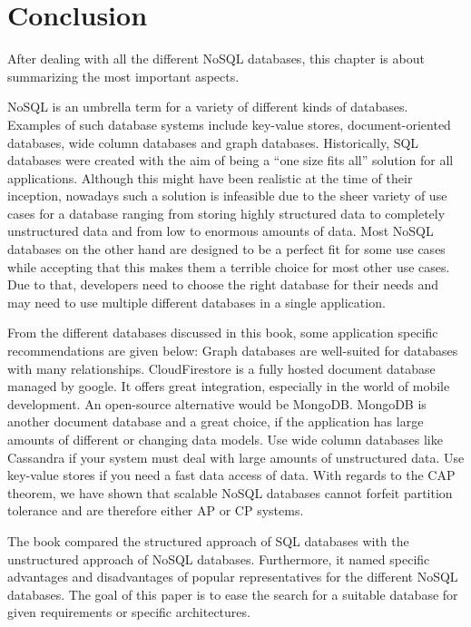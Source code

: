 
\chapter{Conclusion}
After dealing with all the different NoSQL databases, this chapter is about
summarizing the most important aspects.

NoSQL is an umbrella term for a variety of different kinds of databases.
Examples of such database systems include key-value stores, document-oriented
databases, wide column databases and graph databases. Historically, SQL
databases were created with the aim of being a “one size fits all” solution for
all applications. Although this might have been realistic at the time of their
inception, nowadays such a solution is infeasible due to the sheer variety of
use cases for a database ranging from storing highly structured data to
completely unstructured data and from low to enormous amounts of data. Most
NoSQL databases on the other hand are designed to be a perfect fit for some use
cases while accepting that this makes them a terrible choice for most other use
cases. Due to that, developers need to choose the right database for their needs
and may need to use multiple different databases in a single application.

From the different databases discussed in this book, some application specific
recommendations are given below: Graph databases are well-suited for databases
with many relationships. CloudFirestore is a fully hosted document database
managed by google. It offers great integration, especially in the world of
mobile development. An open-source alternative would be MongoDB. MongoDB is
another document database and a great choice, if the application has large
amounts of different or changing data models. Use wide column databases like
Cassandra if your system must deal with large amounts of unstructured data. Use
key-value stores if you need a fast data access of data. With regards to the CAP
theorem, we have shown that scalable NoSQL databases cannot forfeit partition
tolerance and are therefore either AP or CP systems.

The book compared the structured approach of SQL databases with the unstructured
approach of NoSQL databases. Furthermore, it named specific advantages and disadvantages
of popular representatives for the different NoSQL databases.
The goal of this paper is to ease the search for a suitable database for given requirements or
specific architectures.

